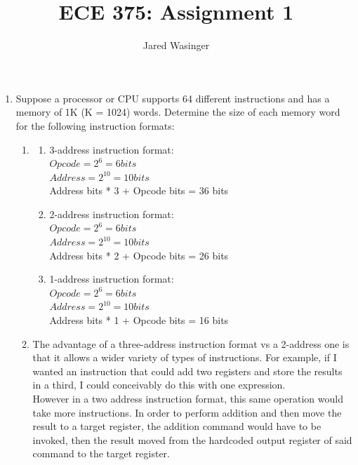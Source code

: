 \documentclass{article}
\begin{document}
  \title{ECE 375: Assignment 1}
  \author{Jared Wasinger}

  \maketitle

  \begin{enumerate}
      \item Suppose a processor or CPU supports 64 different instructions and has a memory of 1K (K = 1024) words.
      Determine the size of each memory word for the following instruction formats: 
      \begin{enumerate}
        \item\begin{enumerate}
          \item 3-address instruction format:\\
            $Opcode = 2^6 = 6 bits$\\
            $Address = 2^{10} = 10 bits$\\
            Address bits * 3 + Opcode bits = 36 bits
          \item 2-address instruction format:\\
            $Opcode = 2^6 = 6 bits$\\
            $Address = 2^{10} = 10 bits$\\
            Address bits * 2 + Opcode bits = 26 bits
          \item 1-address instruction format:\\
            $Opcode = 2^6 = 6 bits$\\
            $Address = 2^{10} = 10 bits$\\
            Address bits * 1 + Opcode bits = 16 bits
        \end{enumerate}
        \item The advantage of a three-address instruction format vs a 2-address one is that it allows a wider variety of types of instructions.  For example, if I wanted an instruction that could add two registers and store the results in a third, I could conceivably do this with one expression.\\
        However in a two address instruction format, this same operation would take more instructions.  In order to perform addition and then move the result to a target register, the addition command would have to be invoked, then the result moved from the hardcoded output register of said command to the target register.\\


\end{enumerate}
\end{enumerate}
\end{document}
